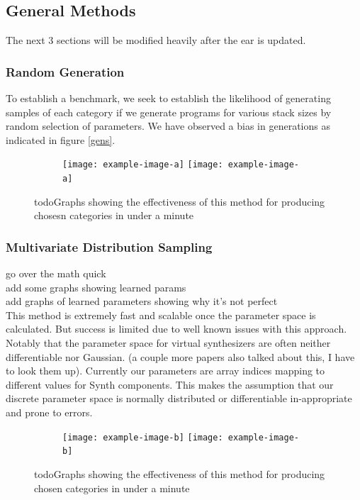 \documentclass{nime-alternate} %
\begin{document}
\subsection{General Methods}
\colorbox{green!=30}{The next 3 sections will be modified heavily after the ear is updated.}
\subsubsection{Random Generation}
To establish a benchmark, we seek to establish the likelihood of generating samples of each category if we generate programs for various stack sizes by random selection of parameters. We have observed a bias in generations as indicated in figure \ref{gens}.\\
\begin{figure}[H]
\centering
\begin{subfigure}[b]{\linewidth}
\texttt{[image: example-image-a]}
\texttt{[image: example-image-a]}
\label{fig:1stack}
\setcounter{subfigure}{2}%
\end{subfigure}
\caption{\colorbox{green!=40}{todo}Graphs showing the effectiveness of this method for producing chosesn categories in under a minute}
\label{fig:rand-graphs}
\end{figure}
\subsubsection{Multivariate Distribution Sampling}
\colorbox{green!=40}{go over the math quick}\\
\colorbox{green!=40}{add some graphs showing learned params}\\
\colorbox{green!=40}{add graphs of learned parameters showing why it's not perfect}\\
This method is extremely fast and scalable once the parameter space is calculated. But success is limited due to well known issues with this approach. Notably that the parameter space for virtual synthesizers are often neither differentiable nor Gaussian. \cite{esling2019universal} (a couple more papers also talked about this, \colorbox{green!=40}{I have to look them up}). Currently our parameters are array indices mapping to different values for Synth components. This makes the assumption that our discrete parameter space is normally distributed or differentiable in-appropriate and prone to errors. \\
\begin{figure}[H]
\centering
\begin{subfigure}[b]{\linewidth}
\texttt{[image: example-image-b]}
\texttt{[image: example-image-b]}
\label{fig:1stack}
\setcounter{subfigure}{2}%
\end{subfigure}
\caption{\colorbox{green!=40}{todo}Graphs showing the effectiveness of this method for producing chosen categories in under a minute}
\label{fig:multi-graphs}
\end{figure}
\end{document}
